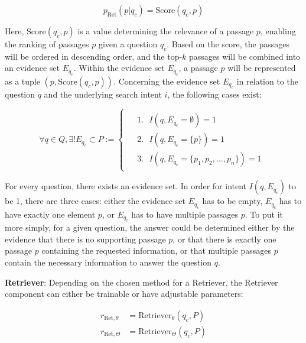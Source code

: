 \begin{equation}
    p_{\text{Ret}}(p|q_c) = \text{Score}(q_c,p)
    \label{eq:retriever}
\end{equation}

Here, $\text{Score}(q_c,p)$ is a value determining the relevance of a passage $p$, enabling the ranking of passages $p$ given a question $q_c$. Based on the score, the passages will be ordered in descending order, and the top-$k$ passages will be combined into an evidence set $E_{q_c}$. Within the evidence set $E_{q_c}$, a passage $p$ will be represented as a tuple $(p, \text{Score}(q_c,p))$. Concerning the evidence set $E_{q_c}$ in relation to the question $q$ and the underlying search intent $i$, the following cases exist:

\begin{equation}
    \forall q \in Q, \exists! E_{q_c} \subset P  := 
    \begin{cases}
        \begin{aligned}
            &1. \text{ } I(q,E_{q_c} = \emptyset) = 1 \\
            &2. \text{ } I(q,E_{q_c} = \{p\}) = 1 \\
            &3. \text{ } I(q,E_{q_c} = \{p_1, p_2, \dots, p_n\}) = 1
        \end{aligned}
    \end{cases}
    \label{eq:evidence_cases}
\end{equation}

For every question, there exists an evidence set. In order for intent $I(q,E_{q_c})$ to be 1, there are three cases: either the evidence set $E_{q_c}$ has to be empty, $E_{q_c}$ has to have exactly one element $p$, or $E_{q_c}$ has to have multiple passages $p$. To put it more simply, for a given question, the answer could be determined either by the evidence that there is no supporting passage $p$, or that there is exactly one passage $p$ containing the requested information, or that multiple passages $p$ contain the necessary information to answer the question $q$.

\vspace{\baselineskip}

\textbf{Retriever}: Depending on the chosen method for a Retriever, the Retriever component can either be trainable or have adjustable parameters:

\begin{align}
    r_{\text{Ret}, \theta} &= \text{Retriever}_\theta(q_c, P) \\
    r_{\text{Ret}, \Theta} &= \text{Retriever}_\Theta(q_c, P)
\end{align}

